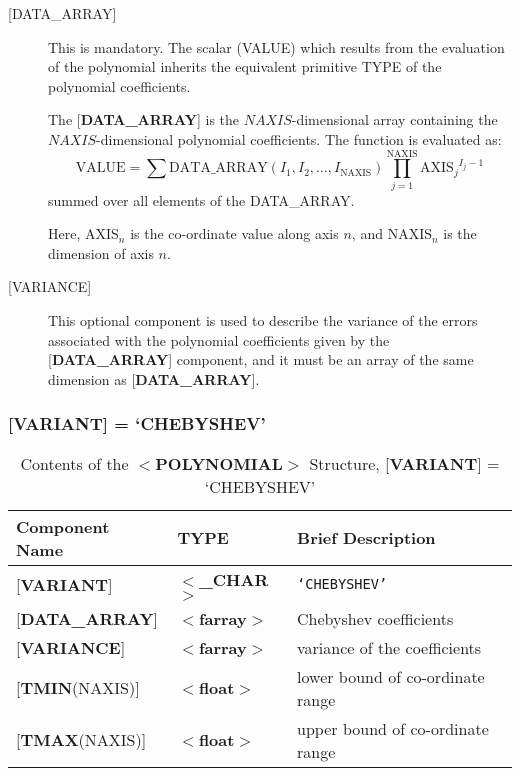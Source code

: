 \documentclass[twoside,11pt,nolof,noabs]{starlink}
\begin{document}
\begin{description}
\item [{[}DATA\_ARRAY{]}] This is mandatory.  The scalar (VALUE) which
results from the evaluation of the polynomial inherits the equivalent
primitive TYPE of the polynomial coefficients.

The {[}\textbf{DATA\_ARRAY}{]} is the $NAXIS$-dimensional array
containing the $NAXIS$-di\-men\-sion\-al poly\-no\-mial
co\-efficients.  The function is evaluated as:
$$\mathrm{VALUE} = \sum \mathrm{DATA\_ARRAY}(I_1,I_2,\ldots,I_{\mathrm{NAXIS}}) \prod_{j=1}^{\mathrm{NAXIS}} \mathrm{AXIS}_j\!^{I_j-1} $$
summed over all elements of the DATA\_ARRAY.

Here, AXIS$_n$ is the co-ordinate value along axis $n$, and NAXIS$_n$
is the dimension of axis $n$.

\item [{[}VARIANCE{]}]  This optional component is used to describe the
variance of the errors associated with the polynomial coefficients
given by the {[}\textbf{DATA\_ARRAY}{]} component, and it must be an
array of the same dimension as {[}\textbf{DATA\_ARRAY}{]}.

\end{description}

\subsubsection{{[}\textbf{VARIANT}{]} = `CHEBYSHEV'}

\begin{table}[hbt]
\centering
\caption{Contents of the $<$\textbf{POLYNOMIAL}$>$ Structure,
               {[}\textbf{VARIANT}{]} = `CHEBYSHEV'}
\begin{tabular}{|l|l|l|}
\hline
Component Name & TYPE & Brief Description \\ \hline
{[}\textbf{VARIANT}{]} & $<$\textbf{\_CHAR}$>$ & \texttt{`CHEBYSHEV'} \\
{[}\textbf{DATA\_ARRAY}{]} & $<$\textbf{farray}$>$ & Chebyshev coefficients \\
{[}\textbf{VARIANCE}{]}  & $<$\textbf{farray}$>$ & variance of the coefficients \\
{[}\textbf{TMIN}(NAXIS){]} & $<$\textbf{float}$>$ & lower bound of co-ordinate range\\
{[}\textbf{TMAX}(NAXIS){]} & $<$\textbf{float}$>$ & upper bound of co-ordinate range\\ \hline
\end{tabular}
\end{table}
\end{document}
